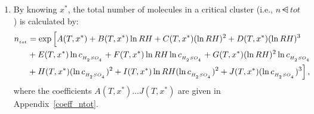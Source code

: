 \begin{enumerate}
\item By knowing $x^*$, the total number of molecules in a critical
cluster (i.e., $n\dsub{tot}$) is calculated by:
%
\begin{align}
n_{_{tot}} &= \exp \Big[ A(T,x^*) + B(T,x^*) \ln RH +
                  C(T,x^*) (\ln RH)^2 + D(T,x^*) (\ln RH)^3 \nonumber \\
           &+ E(T,x^*) \ln c_{_{H_{_2}SO_{_4}}} + F(T,x^*) \ln RH \ln c_{_{H_{_2}SO_{_4}}} +
                G(T,x^*) (\ln RH)^2 \ln c_{_{H_{_2}SO_{_4}}} \nonumber \\
           &+ H(T,x^*) (\ln c_{_{H_{_2}SO_{_4}}})^2 +
                 I(T,x^*) \ln RH (\ln c_{_{H_{_2}SO_{_4}}})^2 +
                 J(T,x^*) (\ln c_{_{H_{_2}SO_{_4}}})^3 \Big] \,, \label{vk2002_ntot}
\end{align}
%
where the coefficients $A(T,x^*) \dots J(T,x^*)$ are given in Appendix~\ref{coeff_ntot}.

\end{enumerate}
